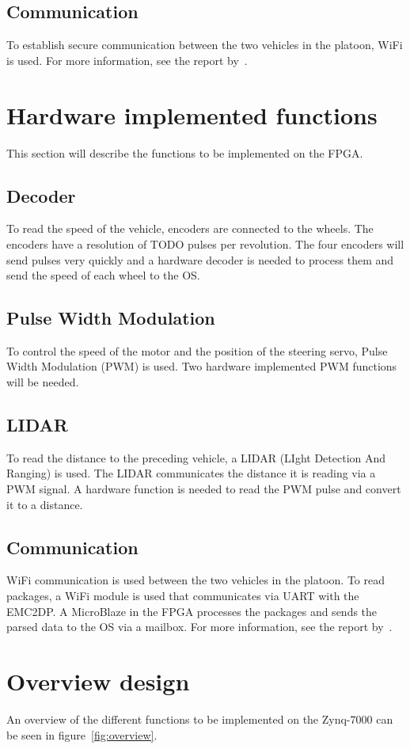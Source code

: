 \subsection{Communication}
To establish secure communication between the two vehicles in the platoon, WiFi is used. For more information, see the report by~\cite{lerander2017}.

\section{Hardware implemented functions}
This section will describe the functions to be implemented on the FPGA.

\subsection{Decoder}
To read the speed of the vehicle, encoders are connected to the wheels. The encoders have a resolution of TODO pulses per revolution. The four encoders will send pulses very quickly and a hardware decoder is needed to process them and send the speed of each wheel to the OS.

\subsection{Pulse Width Modulation}
To control the speed of the motor and the position of the steering servo, Pulse Width Modulation (PWM) is used. Two hardware implemented PWM functions will be needed.

\subsection{LIDAR}
To read the distance to the preceding vehicle, a LIDAR (LIght Detection And Ranging) is used. The LIDAR communicates the distance it is reading via a PWM signal. A hardware function is needed to read the PWM pulse and convert it to a distance.

\subsection{Communication}
WiFi communication is used between the two vehicles in the platoon. To read packages, a WiFi module is used that communicates via UART with the EMC2DP. A MicroBlaze in the FPGA processes the packages and sends the parsed data to the OS via a mailbox. For more information, see the report by~\cite{lerander2017}.

\section{Overview design}
An overview of the different functions to be implemented on the Zynq-7000 can be seen in figure~\ref{fig:overview}.


